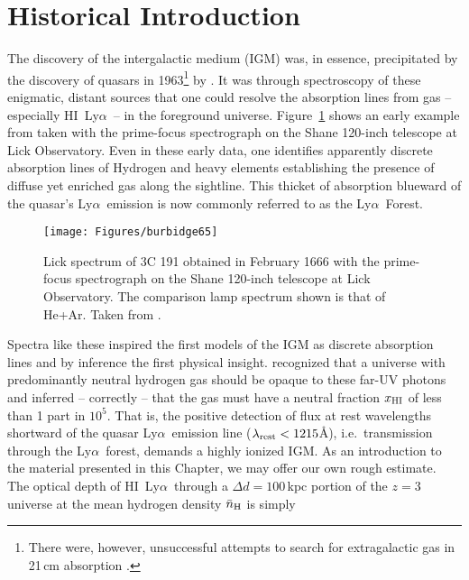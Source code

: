 \documentclass[graybox]{svmult}
\newcommand{\HI}{H{\sc I}}
\def\lya{Ly$\alpha$}
\begin{document}
\section{Historical Introduction}
\label{sec:history}

The discovery of the intergalactic medium (IGM)
was, in essence, precipitated by the discovery of 
quasars in 1963\footnote{There were, however, 
unsuccessful attempts to search for extragalactic gas 
in 21\,cm absorption
\cite[]{field59}.} by \cite{schmidt63}.
It was through spectroscopy of these enigmatic, distant
sources that one could resolve the absorption lines
from gas -- especially \HI\ \lya\ -- 
in the foreground universe.  
Figure~\ref{fig:burb} shows an early example from
\cite{blb66} taken with the prime-focus spectrograph
on the Shane 120-inch telescope at Lick Observatory.
Even in these early data, one identifies apparently
discrete absorption lines of Hydrogen and heavy
elements establishing the presence of diffuse yet
enriched gas along the sightline. 
This thicket of absorption blueward of the quasar's
\lya\ emission is now commonly referred to as the 
\lya\ Forest.



%
\begin{figure}[b]
\sidecaption
\texttt{[image: Figures/burbidge65]}
%
%
\caption{Lick spectrum of 3C 191 obtained in February 1666
with the prime-focus spectrograph on the Shane 120-inch
telescope at Lick Observatory.  The comparison lamp spectrum
shown is that of He+Ar.  Taken from \cite{blb66}.
}
\label{fig:burb}       %
\end{figure}


Spectra like these inspired the first models of
the IGM as discrete absorption lines \cite[]{bs66}
and by inference the first physical insight.
\cite{gp65} recognized that a universe with predominantly
neutral hydrogen gas should be opaque to these far-UV
photons and inferred -- correctly -- 
that the gas must have a neutral fraction $x_{\rm HI}$ of less 
than 1 part in $10^5$.
That is, the positive detection of flux at rest wavelengths
shortward of the quasar \lya\ emission line
($\lambda_{\rm rest} < 1215$\AA), i.e.\ transmission
through the \lya\ forest, 
demands a highly ionized IGM.
As an introduction to the material presented in this Chapter,
we may offer our own rough estimate.
The optical depth of \HI\ \lya\ through
a $\Delta d = 100$\,kpc portion of the $z=3$ universe
at the mean hydrogen density $\bar n_{\rm H}$ 
is simply
\end{document}
